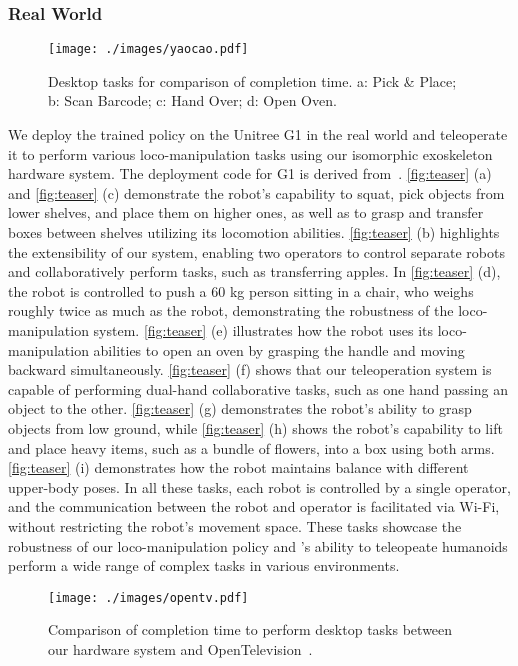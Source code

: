 \subsubsection{Real World}
\begin{figure}[!ht]
  \centering
  \texttt{[image: ./images/yaocao.pdf]}
  \caption{Desktop tasks for comparison of completion time. \textcolor{mycolor}{a:} Pick \& Place; \textcolor{mycolor}{b:} Scan Barcode; \textcolor{mycolor}{c:} Hand Over; \textcolor{mycolor}{d:} Open Oven.}
  \label{fig:compare}
\end{figure}
We deploy the trained policy on the Unitree G1 in the real world and teleoperate it to perform various loco-manipulation tasks using our isomorphic exoskeleton hardware system. The deployment code for G1 is derived from~\cite{margolis2023walk}. \cref{fig:teaser} \textcolor{mycolor}{(a)} and \cref{fig:teaser} \textcolor{mycolor}{(c)} demonstrate the robot's capability to squat, pick objects from lower shelves, and place them on higher ones, as well as to grasp and transfer boxes between shelves utilizing its locomotion abilities. \cref{fig:teaser} \textcolor{mycolor}{(b)} highlights the extensibility of our system, enabling two operators to control separate robots and collaboratively perform tasks, such as transferring apples. In \cref{fig:teaser} \textcolor{mycolor}{(d)}, the robot is controlled to push a 60 kg person sitting in a chair, who weighs roughly twice as much as the robot, demonstrating the robustness of the loco-manipulation system. \cref{fig:teaser} \textcolor{mycolor}{(e)} illustrates how the robot uses its loco-manipulation abilities to open an oven by grasping the handle and moving backward simultaneously. \cref{fig:teaser} \textcolor{mycolor}{(f)} shows that our teleoperation system is capable of performing dual-hand collaborative tasks, such as one hand passing an object to the other. \cref{fig:teaser} \textcolor{mycolor}{(g)} demonstrates the robot's ability to grasp objects from low ground, while \cref{fig:teaser} \textcolor{mycolor}{(h)} shows the robot’s capability to lift and place heavy items, such as a bundle of flowers, into a box using both arms. \cref{fig:teaser} \textcolor{mycolor}{(i)} demonstrates how the robot maintains balance with different upper-body poses. In all these tasks, each robot is controlled by a single operator, and the communication between the robot and operator is facilitated via Wi-Fi, without restricting the robot's movement space. These tasks showcase the robustness of our loco-manipulation policy and \ourshort’s ability to teleopeate humanoids perform a wide range of complex tasks in various environments.
\begin{figure}[!ht]
  \centering
  \texttt{[image: ./images/opentv.pdf]}
  \caption{Comparison of completion time     to perform desktop tasks between our hardware system and OpenTelevision~\cite{cheng2024open}.}
  \label{fig:opentv}
\end{figure}


